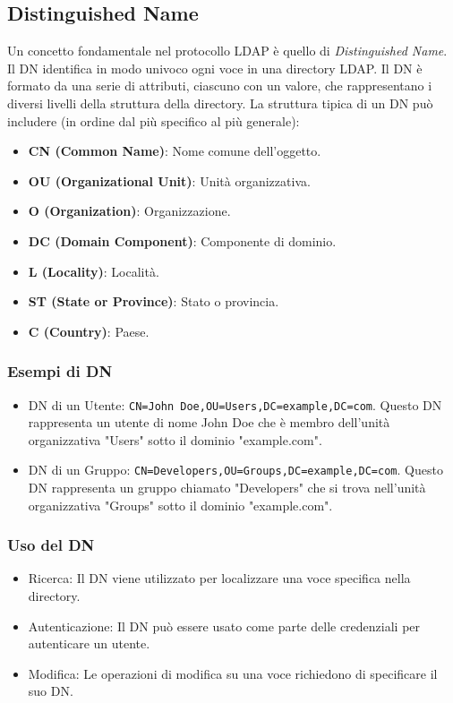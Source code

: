 \documentclass[12pt,a4paper]{report}
\begin{document}
\subsection{Distinguished Name}
Un concetto fondamentale nel protocollo LDAP è quello di \textit{Distinguished Name}. Il DN identifica in modo univoco ogni voce in una directory LDAP.
Il DN è formato da una serie di attributi, ciascuno con un valore, che rappresentano i diversi livelli della struttura della directory. La struttura tipica di un DN può includere (in ordine dal più specifico al più generale):
\begin{itemize}
    \item \textbf{CN (Common Name)}: Nome comune dell'oggetto.
    \item \textbf{OU (Organizational Unit)}: Unità organizzativa.
    \item \textbf{O (Organization)}: Organizzazione.
    \item \textbf{DC (Domain Component)}: Componente di dominio.
    \item \textbf{L (Locality)}: Località.
    \item \textbf{ST (State or Province)}: Stato o provincia.
    \item \textbf{C (Country)}: Paese.
\end{itemize}
\subsubsection{Esempi di DN}
\begin{itemize}
    \item DN di un Utente: \texttt{CN=John Doe,OU=Users,DC=example,DC=com}. Questo DN rappresenta un utente di nome John Doe che è membro dell'unità organizzativa "Users" sotto il dominio "example.com".
    \item DN di un Gruppo: \texttt{CN=Developers,OU=Groups,DC=example,DC=com}. Questo DN rappresenta un gruppo chiamato "Developers" che si trova nell'unità organizzativa "Groups" sotto il dominio "example.com".
\end{itemize}
\subsubsection{Uso del DN}
\begin{itemize}
    \item Ricerca: Il DN viene utilizzato per localizzare una voce specifica nella directory.
    \item Autenticazione: Il DN può essere usato come parte delle credenziali per autenticare un utente.
    \item Modifica: Le operazioni di modifica su una voce richiedono di specificare il suo DN.
\end{itemize}
\end{document}

